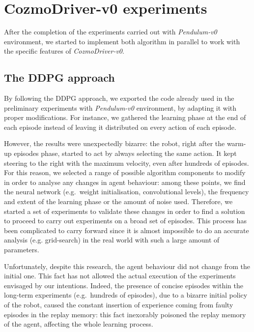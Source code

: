 \FloatBarrier

\section{CozmoDriver-v0 experiments} \label{sec:cozmo-exp}

After the completion of the experiments carried out with \textit{Pendulum-v0} environment, we started to implement both algorithm in parallel to work with the specific features of \textit{CozmoDriver-v0}.

\subsection{The DDPG approach}

By following the DDPG approach, we exported the code already used in the preliminary experiments with \textit{Pendulum-v0} environment, by adapting it with proper modifications.
For instance, we gathered the learning phase at the end of each episode instead of leaving it distributed on every action of each episode.

However, the results were unexpectedly bizarre: the robot, right after the warm-up episodes phase, started to act by always selecting the same action. It kept steering to the right with the maximum velocity, even after hundreds of episodes.
For this reason, we selected a range of possible algorithm components to modify in order to analyse any changes in agent behaviour: among these points, we find the neural network (e.g.\ weight initialisation, convolutional levels), the frequency and extent of the learning phase or the amount of noise used.
Therefore, we started a set of experiments to validate these changes in order to find a solution to proceed to carry out experiments on a broad set of episodes.
This process has been complicated to carry forward since it is almost impossible to do an accurate analysis (e.g. grid-search) in the real world with such a large amount of parameters.

Unfortunately, despite this research, the agent behaviour did not change from the initial one.
This fact has not allowed the actual execution of the experiments envisaged by our intentions.
Indeed, the presence of concise episodes within the long-term experiments (e.g.\ hundreds of episodes), due to a bizarre initial policy of the robot, caused the constant insertion of experience coming from faulty episodes in the replay memory: this fact inexorably poisoned the replay memory of the agent, affecting the whole learning process.

